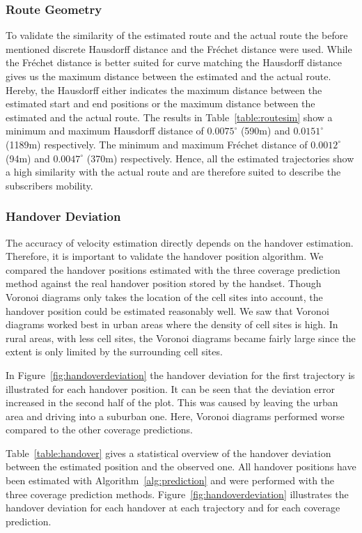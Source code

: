 \documentclass[twocolumn]{bmcart}%
\begin{document}
\subsubsection*{Route Geometry}
To validate the similarity of the estimated route and the actual route the before mentioned discrete Hausdorff distance and the Fr\'{e}chet distance were used. While the Fr\'{e}chet distance is better suited for curve matching the Hausdorff distance gives us the maximum distance between the estimated and the actual route. Hereby, the Hausdorff either indicates the maximum distance between the estimated start and end positions or the maximum distance between the estimated and the actual route. The results in Table~\ref{table:routesim} show a minimum and maximum Hausdorff distance of $0.0075^\circ$ (590m) and $0.0151^\circ$ (1189m) respectively. The minimum and maximum Fr\'{e}chet distance of $0.0012^\circ$ (94m) and $0.0047^\circ$ (370m) respectively. Hence, all the estimated trajectories show a high similarity with the actual route and are therefore suited to describe the subscribers mobility.
\subsubsection*{Handover Deviation}
The accuracy of velocity estimation directly depends on the handover estimation. Therefore, it is important to validate the handover position algorithm. We compared the handover positions estimated with the three coverage prediction method against the real handover position stored by the handset. Though Voronoi diagrams only takes the location of the cell sites into account, the handover position could be estimated reasonably well. We saw that Voronoi diagrams worked best in urban areas where the density of cell sites is high. In rural areas, with less cell sites, the Voronoi diagrams became fairly large since the extent is only limited by the surrounding cell sites. 

In Figure~\ref{fig:handoverdeviation} the handover deviation for the first trajectory is illustrated for each handover position. It can be seen that the deviation error increased in the second half of the plot. This was caused by leaving the urban area and driving into a suburban one. Here, Voronoi diagrams performed worse compared to the other coverage predictions.

Table~\ref{table:handover} gives a statistical overview of the handover deviation between the estimated position and the observed one. All handover positions have been estimated with Algorithm~\ref{alg:prediction} and were performed with the three coverage prediction methods. Figure~\ref{fig:handoverdeviation} illustrates the handover deviation for each handover at each trajectory and for each coverage prediction.
\end{document}
